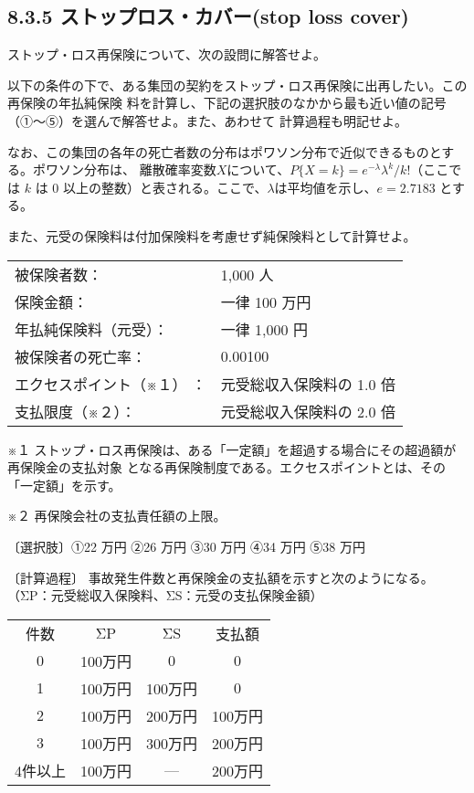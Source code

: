 \documentclass[report,gutter=10mm,fore-edge=10mm,uplatex,dvipdfmx]{jlreq}
\begin{document}
\subsection{8.3.5 ストップロス・カバー(stop loss cover)}

ストップ・ロス再保険について、次の設問に解答せよ。

以下の条件の下で、ある集団の契約をストップ・ロス再保険に出再したい。この再保険の年払純保険
料を計算し、下記の選択肢のなかから最も近い値の記号（①～⑤）を選んで解答せよ。また、あわせて
計算過程も明記せよ。

なお、この集団の各年の死亡者数の分布はポワソン分布で近似できるものとする。ポワソン分布は、
離散確率変数$X$について、$P\{X=k\}=e^{-\lambda}\lambda^k/k!$（ここでは $k$ は 0 以上の整数）と表される。ここで、$\lambda$は平均値を示し、$e=2.7183$ とする。

また、元受の保険料は付加保険料を考慮せず純保険料として計算せよ。
\begin{tabular}{ll}
被保険者数：&1,000 人\\
保険金額：&一律 100 万円\\
年払純保険料（元受）：&一律 1,000 円\\
被保険者の死亡率：&0.00100\\
エクセスポイント（※１） ：&元受総収入保険料の 1.0 倍\\
支払限度（※２）：&元受総収入保険料の 2.0 倍\\
\end{tabular}

※１ ストップ・ロス再保険は、ある「一定額」を超過する場合にその超過額が再保険金の支払対象
となる再保険制度である。エクセスポイントとは、その「一定額」を示す。

※２ 再保険会社の支払責任額の上限。

〔選択肢〕①22 万円 ②26 万円 ③30 万円 ④34 万円 ⑤38 万円

\answer{}

\noindent 〔計算過程〕
事故発生件数と再保険金の支払額を示すと次のようになる。（ΣP：元受総収入保険料、ΣS：元受の支払保険金額）

\begin{tabular}{cccc}
 件数& ΣP& ΣS&支払額\\
 0& 100万円& 0& 0\\
 1& 100万円& 100万円& 0\\
 2& 100万円& 200万円& 100万円\\
 3& 100万円& 300万円& 200万円\\
 4件以上& 100万円& --- & 200万円\\
\end{tabular}
\end{document}
